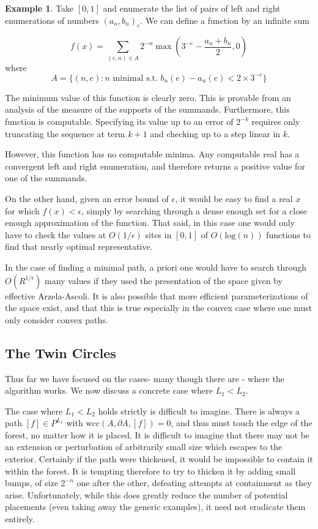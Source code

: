 \documentclass{journal}
\theoremstyle{definition}
\newtheorem{example}[thm]{Example}
\begin{document}
\begin{example}
 Take $[0,1]$ and enumerate the list of pairs of left and right enumerations of numbers $(a_n,b_n)_e$. We can define a function by an infinite sum

$$f(x) = \sum_{(e,n)\in A} 2^{-n}\max\left(3^{-e}-\frac{a_n+b_n}{2},0\right) $$
where 
$$A = \{(n,e) : n \text { minimal s.t. } b_n(e)-a_n(e)< 2\times3^{-e}\}$$

The minimum value of this function is clearly zero. This is provable from an analysis of the measure of the supports of the summands. Furthermore, this function is computable. Specifying its value  up to an error of $2^{-k}$ requires only truncating the sequence at term $k+1$ and checking up to a step linear in $k$.

However, this function has no computable minima. Any computable real has a convergent left and right enumeration, and therefore returns a positive value for one of the summands.

On the other hand, given an error bound of $\epsilon$, it would be easy to find a real $x$ for which $f(x) <\epsilon$, simply by searching through a dense enough set for a close enough approximation of the function. That said, in this case one would only have to check the values at $O(1/\epsilon)$ sites in $[0,1]$  of $O(\mathrm{log}(n))$ functions to find that nearly optimal representative.

\end{example}
\label{example:argmin}

In the case of finding a minimal path, a priori one would have to search through $O(R^{1/\epsilon})$ many values if they used the presentation of the space given by effective Arzela-Ascoli. It is also possible that more efficient parameterizations of the space exist, and that this is true especially in the convex case where one must only consider convex paths.

\subsection{The Twin Circles}
\label{sec:andtwins}
Thus far we have focused on the cases- many though there are - where the algorithm works. We now discuss a concrete case where $L_1 < L_2$.

The case where $L_1 < L_2$ holds strictly is difficult to imagine. There is always a path $[f]\in P^{L_1}$ with $\mathrm{wcc}(A,\partial A, [f]) = 0$, and thus must touch the edge of the forest, no matter how it is placed. It is difficult to imagine that there may not be an extension or perturbation of arbitrarily small size which escapes to the exterior. Certainly if the path were thickened, it would be impossible to contain it within the forest. It is tempting therefore to try to thicken it by adding small bumps, of size $2^{-n}$ one after the other, defeating attempts at containment as they arise. Unfortunately, while this does greatly reduce the number of potential placements (even taking away the generic examples), it need not eradicate them entirely.
\end{document}
